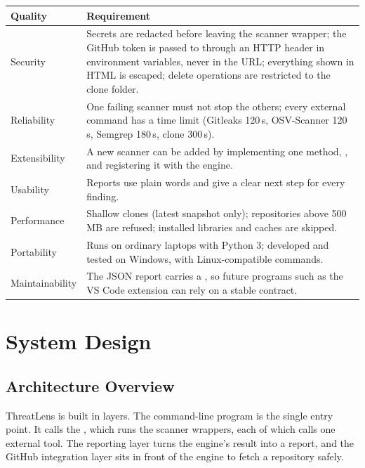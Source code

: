 \documentclass[12pt,a4paper]{article}
\newcommand{\code}[1]{\texttt{\detokenize{#1}}}
\begin{document}
\begin{longtable}{@{}p{3.2cm}p{11.8cm}@{}}
\toprule
\textbf{Quality} & \textbf{Requirement} \\
\midrule
\endhead
Security & Secrets are redacted before leaving the scanner wrapper; the GitHub token is passed to \code{git} through an HTTP header in environment variables, never in the URL; everything shown in HTML is escaped; delete operations are restricted to the clone folder. \\
Reliability & One failing scanner must not stop the others; every external command has a time limit (Gitleaks 120\,s, OSV-Scanner 120\,s, Semgrep 180\,s, clone 300\,s). \\
Extensibility & A new scanner can be added by implementing one method, \code{scan(repo_path)}, and registering it with the engine. \\
Usability & Reports use plain words and give a clear next step for every finding. \\
Performance & Shallow clones (latest snapshot only); repositories above 500\,MB are refused; installed libraries and caches are skipped. \\
Portability & Runs on ordinary laptops with Python 3; developed and tested on Windows, with Linux-compatible commands. \\
Maintainability & The JSON report carries a \code{schema_version}, so future programs such as the VS Code extension can rely on a stable contract. \\
\bottomrule
\end{longtable}
\section{System Design}

\subsection{Architecture Overview}

ThreatLens is built in layers. The command-line program is the single entry point. It calls the \code{SecurityEngine}, which runs the scanner wrappers, each of which calls one external tool. The reporting layer turns the engine's result into a report, and the GitHub integration layer sits in front of the engine to fetch a repository safely.
\end{document}
